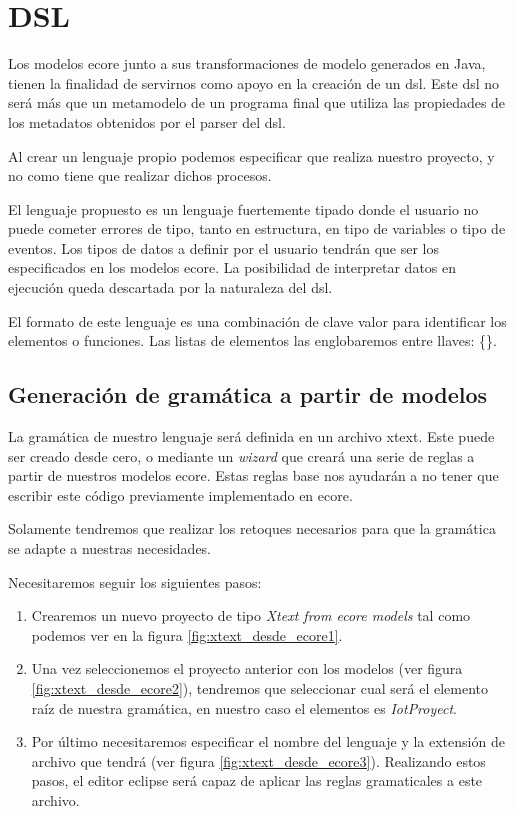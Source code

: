\section{DSL}

Los modelos \gls{ecore} junto a sus transformaciones de modelo generados en Java, tienen la finalidad de servirnos como apoyo en la creación de un \gls{dsl}.
Este \gls{dsl} no será más que un \gls{metamodelo} de un programa final que utiliza las propiedades de los \gls{metadatos} obtenidos por el parser del \gls{dsl}.

Al crear un lenguaje propio podemos especificar que realiza nuestro proyecto, y no como tiene que realizar dichos procesos. 

El lenguaje propuesto es un lenguaje fuertemente tipado donde el usuario no puede cometer errores de tipo, tanto en estructura, en tipo de variables o tipo de eventos. Los tipos de datos a definir por el usuario tendrán que ser los especificados en los modelos \gls{ecore}. La posibilidad de interpretar datos en ejecución queda descartada por la naturaleza del \gls{dsl}.

El formato de este lenguaje es una combinación de clave  valor para identificar los elementos o funciones.
Las listas de elementos las englobaremos entre llaves: \{\}.


\subsection{Generación de gramática a partir de modelos}

La gramática de nuestro lenguaje será definida en un archivo \gls{xtext}. Este puede ser creado desde cero, o mediante un \textit{wizard} que creará una serie de reglas a partir de nuestros modelos \gls{ecore}. Estas reglas base nos ayudarán a no tener que escribir este código previamente implementado en \gls{ecore}.

Solamente tendremos que realizar los retoques necesarios para que la gramática se adapte a nuestras necesidades.

Necesitaremos seguir los siguientes pasos:

\begin{enumerate}
    \item Crearemos un nuevo proyecto de tipo \textit{Xtext from ecore models} tal como podemos ver en la figura \ref{fig:xtext_desde_ecore1}.
    \item Una vez seleccionemos el proyecto anterior con los modelos (ver figura \ref{fig:xtext_desde_ecore2}),  tendremos que seleccionar cual será el elemento raíz de nuestra gramática, en nuestro caso el elementos es \textit{IotProyect}.
    \item Por último necesitaremos especificar el nombre del lenguaje y la extensión de archivo que tendrá (ver figura \ref{fig:xtext_desde_ecore3}). Realizando estos pasos, el editor eclipse será capaz de aplicar las reglas gramaticales a este archivo.
\end{enumerate}



